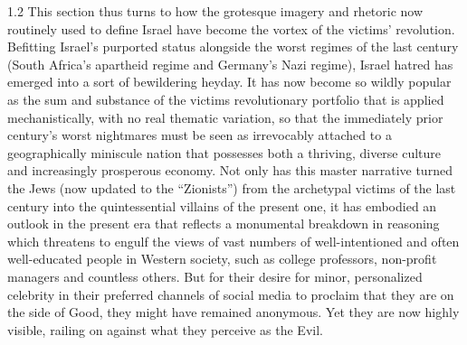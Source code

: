 \documentclass[../unravbook.tex]{subfiles}
\begin{document}
\begin{spacing}{1.2}
This section thus turns to how the grotesque imagery and rhetoric now routinely used to define Israel have become the vortex of the victims' revolution. Befitting Israel's purported status alongside the worst regimes of the last century (South Africa's apartheid regime and Germany's Nazi regime), Israel hatred has emerged into a sort of bewildering heyday. It has now become so wildly popular as the sum and substance of the victims revolutionary portfolio that is applied mechanistically, with no real thematic variation, so that the immediately prior century's worst nightmares must be seen as irrevocably attached to a geographically miniscule nation that possesses both a thriving, diverse culture and increasingly prosperous economy. Not only has this master narrative turned the Jews (now updated to the \enquote{Zionists}) from the archetypal victims of the last century into the quintessential villains of the present one, it has embodied an outlook in the present era that reflects a monumental breakdown in reasoning which threatens to engulf the views of vast numbers of well-intentioned and often well-educated people in Western society, such as college professors, non-profit managers and countless others. But for their desire for minor, personalized celebrity in their preferred channels of social media to proclaim that they are on the side of Good, they might have remained anonymous. Yet they are now highly visible, railing on against what they perceive as the Evil.


\end{spacing}
\end{document}
